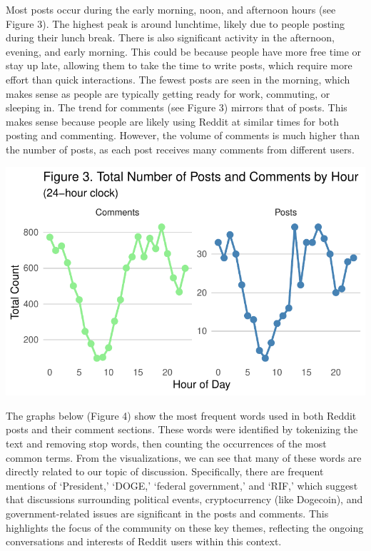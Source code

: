 \documentclass[
  12pt]{article}
\begin{document}
Most posts occur during the early morning, noon, and afternoon hours
(see Figure 3). The highest peak is around lunchtime, likely due to
people posting during their lunch break. There is also significant
activity in the afternoon, evening, and early morning. This could be
because people have more free time or stay up late, allowing them to
take the time to write posts, which require more effort than quick
interactions. The fewest posts are seen in the morning, which makes
sense as people are typically getting ready for work, commuting, or
sleeping in. The trend for comments (see Figure 3) mirrors that of
posts. This makes sense because people are likely using Reddit at
similar times for both posting and commenting. However, the volume of
comments is much higher than the number of posts, as each post receives
many comments from different users.

\includegraphics{paper_files/figure-pdf/unnamed-chunk-5-1.pdf}

The graphs below (Figure 4) show the most frequent words used in both
Reddit posts and their comment sections. These words were identified by
tokenizing the text and removing stop words, then counting the
occurrences of the most common terms. From the visualizations, we can
see that many of these words are directly related to our topic of
discussion. Specifically, there are frequent mentions of `President,'
`DOGE,' `federal government,' and `RIF,' which suggest that discussions
surrounding political events, cryptocurrency (like Dogecoin), and
government-related issues are significant in the posts and comments.
This highlights the focus of the community on these key themes,
reflecting the ongoing conversations and interests of Reddit users
within this context.
\end{document}
